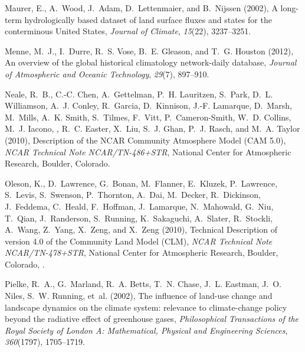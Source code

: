 \documentclass[draft,ms]{agutex}   %
\begin{document}
\begin{article}
\begin{thebibliography}{43}
Maurer, E., A.~Wood, J.~Adam, D.~Lettenmaier, and B.~Nijssen (2002), {A
  long-term hydrologically based dataset of land surface fluxes and states for
  the conterminous United States}, \textit{Journal of Climate},
  \textit{15}(22), 3237--3251.

Menne, M.~J., I.~Durre, R.~S. Vose, B.~E. Gleason, and T.~G. Houston (2012), An
  overview of the global historical climatology network-daily database,
  \textit{Journal of Atmospheric and Oceanic Technology}, \textit{29}(7),
  897--910.

Neale, R.~B., C.-C. Chen, A.~Gettelman, P.~H. Lauritzen, S.~Park, D.~L.
  Williamson, A.~J. Conley, R.~Garcia, D.~Kinnison, J.-F. Lamarque, D.~Marsh,
  M.~Mills, A.~K. Smith, S.~Tilmes, F.~Vitt, P.~Cameron-Smith, W.~D. Collins,
  M.~J. Iacono, , R.~C. Easter, X.~Liu, S.~J. Ghan, P.~J. Rasch, and M.~A.
  Taylor (2010), Description of the {NCAR} {C}ommunity {A}tmosphere {M}odel
  ({CAM} 5.0), \textit{NCAR Technical Note NCAR/TN-486+STR}, National Center
  for Atmospheric Research, Boulder, Colorado.

Oleson, K., D.~Lawrence, G.~Bonan, M.~Flanner, E.~Kluzek, P.~Lawrence,
  S.~Levis, S.~Swenson, P.~Thornton, A.~Dai, M.~Decker, R.~Dickinson,
  J.~Feddema, C.~Heald, F.~Hoffman, J.~Lamarque, N.~Mahowald, G.~Niu, T.~Qian,
  J.~Randerson, S.~Running, K.~Sakaguchi, A.~Slater, R.~Stockli, A.~Wang,
  Z.~Yang, X.~Zeng, and X.~Zeng (2010), {Technical Description of version 4.0
  of the Community Land Model (CLM)}, \textit{NCAR Technical Note
  NCAR/TN-478+STR}, National Center for Atmospheric Research, Boulder,
  Colorado, .

Pielke, R.~A., G.~Marland, R.~A. Betts, T.~N. Chase, J.~L. Eastman, J.~O.
  Niles, S.~W. Running, et~al. (2002), The influence of land-use change and
  landscape dynamics on the climate system: relevance to climate-change policy
  beyond the radiative effect of greenhouse gases, \textit{Philosophical
  Transactions of the Royal Society of London A: Mathematical, Physical and
  Engineering Sciences}, \textit{360}(1797), 1705--1719.


\end{thebibliography}
\end{article}
\end{document}

